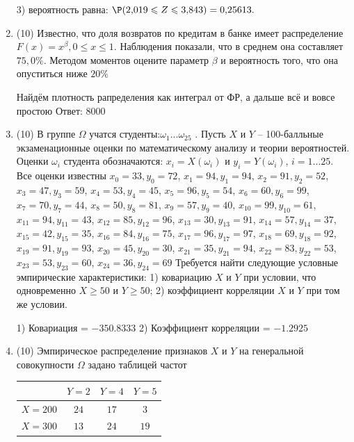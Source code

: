 \documentclass[a4paper,14pt]{article}
\begin{document}
\begin{enumerate}
3) вероятность равна:
$
\P(2,\!019\leqslant Z\leqslant 3,\!843)=
0,\!25613.
$


\item


(10) Известно, что доля возвратов по кредитам в банке имеет распределение $F(x) = x ^{\beta}, 0 \leqslant x \leqslant 1$.
Наблюдения показали, что в среднем она составляет $75,0\%$. Методом моментов оцените параметр $\beta$ и
вероятность того, что она опуститься ниже $20\%$




Найдём плотность рапределения как интеграл от ФР, а дальше всё и вовсе простою Ответ: $8000$


\item


(10) В группе $\Omega$ учатся студенты:$\omega _{1}...\omega _{25}$ . Пусть $X$ и $Y$ – 100-балльные экзаменационные оценки по
математическому анализу и теории вероятностей. Оценки $\omega _{i}$ студента обозначаются: $x _{i} = X(\omega _{i})$ и $y _{i} = Y(\omega _{i})$, $i = 1...25$. Все оценки известны
$x _{0} = 33, y _{0} = 72$, $x _{1} = 94, y _{1} = 94$, $x _{2} = 91, y _{2} = 52$, $x _{3} = 47, y _{3} = 59$, $x _{4} = 53, y _{4} = 45$, $x _{5} = 96, y _{5} = 54$, $x _{6} = 60, y _{6} = 99$, $x _{7} = 70, y _{7} = 44$, $x _{8} = 50, y _{8} = 81$, $x _{9} = 57, y _{9} = 40$, $x _{10} = 99, y _{10} = 61$, $x _{11} = 94, y _{11} = 43$, $x _{12} = 85, y _{12} = 96$, $x _{13} = 30, y _{13} = 91$, $x _{14} = 57, y _{14} = 37$, $x _{15} = 42, y _{15} = 35$, $x _{16} = 84, y _{16} = 75$, $x _{17} = 96, y _{17} = 97$, $x _{18} = 69, y _{18} = 92$, $x _{19} = 91, y _{19} = 93$, $x _{20} = 45, y _{20} = 30$, $x _{21} = 35, y _{21} = 94$, $x _{22} = 83, y _{22} = 53$, $x _{23} = 53, y _{23} = 60$, $x _{24} = 36, y _{24} = 69$
Требуется
найти следующие условные эмпирические характеристики: 1) ковариацию $X$ и $Y$ при условии, что одновременно $X \geqslant 50$
 и $Y \geqslant 50$; 2) коэффициент корреляции $X$ и $Y$ при том же условии.




1) Ковариация = $-350.8333$
2) Коэффициент корреляции = $-1.2925$


\item


(10) Эмпирическое распределение признаков $X$ и $Y$ на генеральной совокупности $\Omega$ задано таблицей частот  
 
\begin{tabular}{ | c | c | c | c | }
\hline
 & $Y = 2$ & $Y = 4$ & $Y = 5$  \\ \hline
$X = 200$ & $24$ & $17$ & $3$\\ \hline
$X = 300$ & $13$ & $24$ & $19$\\
\hline
\end{tabular}


\end{enumerate}
\end{document}
